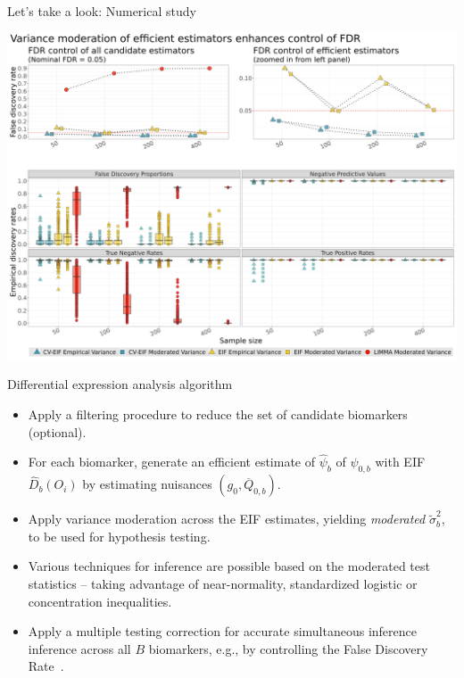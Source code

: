 \documentclass{beamer}
\begin{document}

\begin{frame}{Let's take a look: Numerical study}

\centering
\includegraphics[origin=c,scale=0.205]{fdr_sl_findings_min_logistic_g0prob_no}

\note{
}
\end{frame}


\begin{frame}[c]{Differential expression analysis algorithm}

\begin{center}
\begin{itemize}
  \itemsep6pt
  \item Apply a filtering procedure to reduce the set of candidate
    biomarkers~\citep{tuglus2009modified} (optional).
   \item For each biomarker, generate an efficient estimate of $\hat{\psi}_b$ of
    $\psi_{0,b}$ with EIF $\hat{D}_b(O_i)$ by estimating nuisances $(g_0,
    \overline{Q}_{0,b})$.
  \item Apply variance moderation across the EIF estimates, yielding
    \textit{moderated} $\tilde{\sigma}_b^2$, to be used for hypothesis testing.
  \item Various techniques for inference are possible based on the moderated
    test statistics -- taking advantage of near-normality, standardized logistic
    or concentration inequalities.
  \item Apply a multiple testing correction for accurate simultaneous inference
    inference across all $B$ biomarkers, e.g., by controlling the False
    Discovery Rate~\citep{benjamini1995controlling}.
\end{itemize}
\end{center}

\note{
}
\end{frame}
\end{document}
